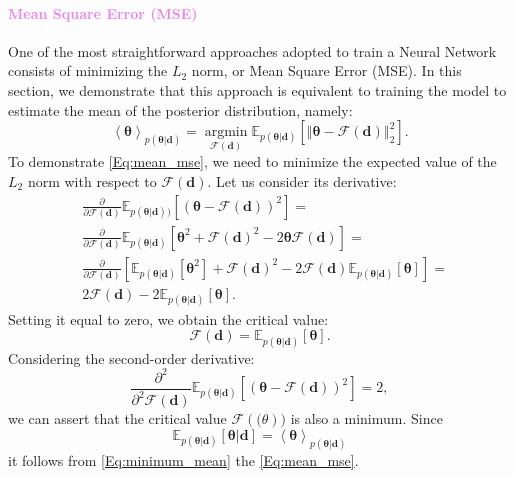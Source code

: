 \documentclass{aa}
\begin{document}
\paragraph{\textcolor{violet}{Mean Square Error (MSE)}}
One of the most straightforward approaches adopted to train a Neural Network consists of minimizing the $L_2$ norm, or Mean Square Error (MSE). In this section, we demonstrate that this approach is equivalent to training the model to estimate the mean of the posterior distribution, namely:
\begin{equation}\label{Eq:mean_mse}
\left \langle \bm {\theta} \right \rangle_{p(\bm {\theta}|\bm{d})}=\operatorname*{argmin}_{\mathcal{F}(\bm{d})}\mathbb{E}_{p(\bm {\theta}|\bm {d})}[\left\Vert \bm {\theta}-\mathcal{F}(\bm{d})
 \right \Vert_{2}^{2}].
\end{equation}
To demonstrate \autoref{Eq:mean_mse}, we need to minimize the expected value of the $L_2$ norm with respect to $\mathcal{F}(\bm{d})$. Let us consider its derivative:
\begin{align}\label{Eq:moment_1}
   & \frac{\partial}{\partial \mathcal{F}(\bm{d}) }  \mathbb{E}_{p(\bm {\theta}|\bm{d}))}[(\bm {\theta}-\mathcal{F}(\bm{d}))^2] =  \\
    &
    \frac{\partial}{\partial \mathcal{F}(\bm{d}) }  \mathbb{E}_{p(\bm {\theta}|\bm {d})}[\bm {\theta}^2+\mathcal{F}(\bm{d})^2-2\bm {\theta}\mathcal{F}(\bm{d})] = \nonumber \\
    &
    \frac{\partial}{\partial \mathcal{F}(\bm{d}) }  [
    \mathbb{E}_{p(\bm {\theta}|\bm {d})}[\bm {\theta}^2]+\mathcal{F}(\bm{d})^2-2\mathcal{F}(\bm{d})\mathbb{E}_{p(\bm {\theta}|\bm {d})}[\bm {\theta}]]= \nonumber \\
    &2\mathcal{F}(\bm{d})-2 \mathbb{E}_{p(\bm {\theta}|\bm {d})}[\bm {\theta}]. \nonumber
\end{align}
Setting it equal to zero, we obtain the critical value:
\begin{equation}
    \mathcal{F}(\bm{d})= \mathbb{E}_{p(\bm {\theta}|\bm {d})}[\bm {\theta}]. 
\end{equation}
Considering the second-order derivative:
\begin{equation}\label{Eq:minimum_mean}
   \frac{\partial^2}{\partial^2 \mathcal{F}(\bm{d})}  \mathbb{E}_{p(\bm {\theta}|\bm {d})}[(\bm {\theta}-\mathcal{F}(\bm{d}))^2]=2, 
\end{equation}
we can assert that the critical value $\mathcal{F(\bm(\theta))}$ is also a minimum. 
Since 
\begin{equation}
    \mathbb{E}_{p(\bm {\theta}|\bm {d})}[\bm {\theta}|\bm{d}]= \left \langle \bm {\theta} \right \rangle_{p(\bm {\theta}|\bm{d})}
\end{equation}
it follows from \autoref{Eq:minimum_mean} the \autoref{Eq:mean_mse}.
\end{document}
